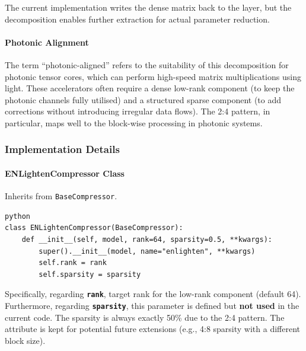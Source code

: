 The current implementation writes the dense matrix back to the layer, but the decomposition enables further extraction for actual parameter reduction.

\paragraph{Photonic Alignment}

The term ``photonic-aligned'' refers to the suitability of this decomposition for photonic tensor cores, which can perform high-speed matrix multiplications using light. These accelerators often require a dense low-rank component (to keep the photonic channels fully utilised) and a structured sparse component (to add corrections without introducing irregular data flows). The 2:4 pattern, in particular, maps well to the block-wise processing in photonic systems.


\subsubsection*{Implementation Details}

\paragraph{ENLightenCompressor Class}

Inherits from \texttt{BaseCompressor}.

\vspace{0.5em}
\begin{mdframed}[backgroundcolor=codebg, linecolor=codeframe, linewidth=1pt, roundcorner=4pt, innerleftmargin=2pt, innerrightmargin=5pt, innertopmargin=5pt, innerbottommargin=5pt]
\begin{lstlisting}
python
class ENLightenCompressor(BaseCompressor):
    def __init__(self, model, rank=64, sparsity=0.5, **kwargs):
        super().__init__(model, name="enlighten", **kwargs)
        self.rank = rank
        self.sparsity = sparsity
\end{lstlisting}
\end{mdframed}
\vspace{0.5em}

Specifically, regarding \textbf{\texttt{rank}}, target rank for the low-rank component (default 64). Furthermore, regarding \textbf{\texttt{sparsity}}, this parameter is defined but \textbf{not used} in the current code. The sparsity is always exactly 50\% due to the 2:4 pattern. The attribute is kept for potential future extensions (e.g., 4:8 sparsity with a different block size).



